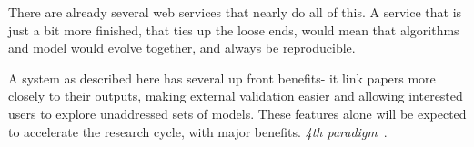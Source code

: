 \documentclass[conference]{IEEEtran}
\begin{document}
There are already several web services that nearly do all of this. A
service that is just a bit more finished, that ties up the loose ends,
would mean that algorithms and model would evolve together, and always
be reproducible.


A system as described here has several up front benefits- it link papers 
more closely to their outputs, making external validation easier and 
allowing interested users to explore unaddressed sets of models. These 
features alone will be expected to accelerate the research cycle, with
major benefits. \emph{4th paradigm}~\cite{hey:2009}.



\end{document}

